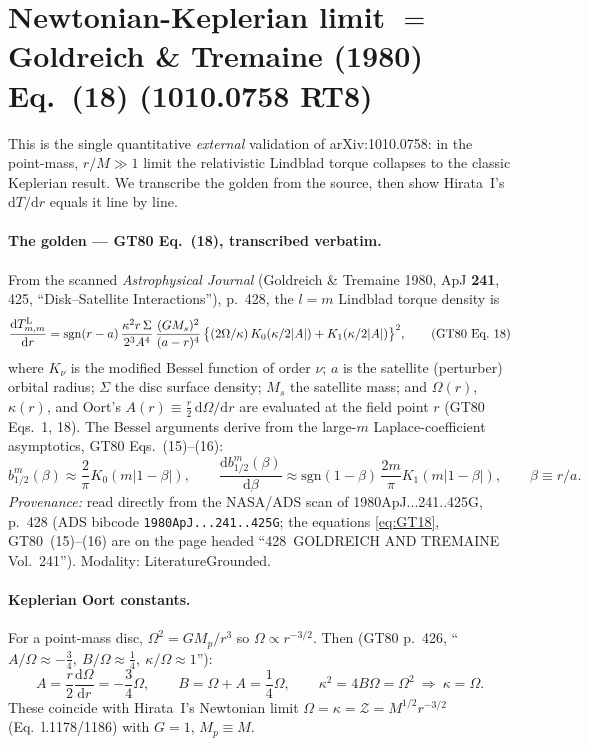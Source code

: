 \documentclass{article}
\newcommand{\rmd}{\mathrm d}
\begin{document}
\section*{Newtonian-Keplerian limit $=$ Goldreich \& Tremaine (1980) Eq.~(18) (1010.0758 RT8)}

This is the single quantitative \emph{external} validation of arXiv:1010.0758: in the point-mass,
$r/M\gg1$ limit the relativistic Lindblad torque collapses to the classic Keplerian result. We
transcribe the golden from the source, then show Hirata~I's $\rmd T/\rmd r$ equals it line by line.

\paragraph{The golden --- GT80 Eq.~(18), transcribed verbatim.} From the scanned
\emph{Astrophysical Journal} (Goldreich \& Tremaine 1980, ApJ \textbf{241}, 425, ``Disk--Satellite
Interactions''), p.~428, the $l=m$ Lindblad torque density is
\begin{equation}
\frac{\rmd T^{\rm L}_{m,m}}{\rmd r}
 = \mathrm{sgn}(r-a)\,\frac{\kappa^2 r\,\Sigma}{2^3 A^4}\,
   \frac{(GM_s)^2}{(a-r)^4}\,
   \bigl\{(2\Omega/\kappa)\,K_0(\kappa/2|A|) + K_1(\kappa/2|A|)\bigr\}^2 ,
\tag{GT80 Eq.~18}
\label{eq:GT18}
\end{equation}
where $K_\nu$ is the modified Bessel function of order $\nu$; $a$ is the satellite (perturber)
orbital radius; $\Sigma$ the disc surface density; $M_s$ the satellite mass; and $\Omega(r)$,
$\kappa(r)$, and Oort's $A(r)\equiv\tfrac{r}{2}\,\rmd\Omega/\rmd r$ are evaluated at the field point
$r$ (GT80 Eqs.~1, 18). The Bessel arguments derive from the large-$m$ Laplace-coefficient
asymptotics, GT80 Eqs.~(15)--(16):
\begin{equation}
b_{1/2}^{m}(\beta)\approx\frac2\pi K_0(m|1-\beta|),
\qquad
\frac{\rmd b_{1/2}^{m}(\beta)}{\rmd\beta}\approx\mathrm{sgn}(1-\beta)\,\frac{2m}\pi K_1(m|1-\beta|),
\qquad \beta\equiv r/a .
\tag{GT80 Eqs.~15--16}
\end{equation}
\emph{Provenance:} read directly from the NASA/ADS scan of 1980ApJ...241..425G, p.~428
(ADS bibcode \texttt{1980ApJ...241..425G}; the equations \eqref{eq:GT18}, GT80~(15)--(16) are on
the page headed ``428 \,GOLDREICH AND TREMAINE\, Vol.~241''). Modality: LiteratureGrounded.

\paragraph{Keplerian Oort constants.} For a point-mass disc, $\Omega^2=GM_p/r^3$ so
$\Omega\propto r^{-3/2}$. Then (GT80 p.~426, ``$A/\Omega\approx-\tfrac34,\ B/\Omega\approx\tfrac14,\
\kappa/\Omega\approx1$''):
\begin{equation}
A=\frac{r}{2}\frac{\rmd\Omega}{\rmd r}=-\frac34\Omega,
\qquad B=\Omega+A=\frac14\Omega,
\qquad \kappa^2=4B\Omega=\Omega^2\ \Rightarrow\ \kappa=\Omega .
\label{eq:oort}
\end{equation}
These coincide with Hirata~I's Newtonian limit
$\Omega=\kappa=\mathcal Z=M^{1/2}r^{-3/2}$ (Eq.~l.1178/1186) with $G=1$, $M_p\equiv M$.
\end{document}
